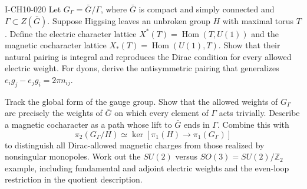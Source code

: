 \begin{exercise}{I-CH10-020}
Let $G_\Gamma=\bar G/\Gamma$, where $\bar G$ is compact and simply connected
and $\Gamma\subset Z(\bar G)$.  Suppose Higgsing leaves an unbroken group
$H$ with maximal torus $T$.  Define the electric character lattice
$X^*(T)=\operatorname{Hom}(T,U(1))$ and the magnetic cocharacter lattice
$X_*(T)=\operatorname{Hom}(U(1),T)$.  Show that their natural pairing is
integral and reproduces the Dirac condition for every allowed electric weight.
For dyons, derive the antisymmetric pairing that generalizes
$e_i g_j-e_j g_i=2\pi n_{ij}$.

Track the global form of the gauge group.  Show that the allowed weights of
$G_\Gamma$ are precisely the weights of $\bar G$ on which every element of
$\Gamma$ acts trivially.  Describe a magnetic cocharacter as a path whose lift
to $\bar G$ ends in $\Gamma$.  Combine this with
\[
  \pi_2(G_\Gamma/H)\simeq
  \ker\!\left[\pi_1(H)\to\pi_1(G_\Gamma)\right]
\]
to distinguish all Dirac-allowed magnetic charges from those realized by
nonsingular monopoles.  Work out the $SU(2)$ versus $SO(3)=SU(2)/\mathbb Z_2$
example, including fundamental and adjoint electric weights and the even-loop
restriction in the quotient description.
\end{exercise}
